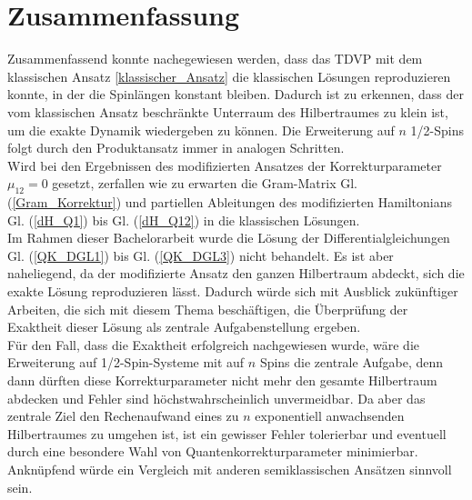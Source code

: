 \chapter{Zusammenfassung}
Zusammenfassend konnte nachegewiesen werden, dass das TDVP mit dem klassischen Ansatz \ref{klassischer_Ansatz} die klassischen Lösungen reproduzieren 
konnte, in der die Spinlängen konstant bleiben. Dadurch ist zu erkennen, dass der vom klassischen Ansatz beschränkte Unterraum des Hilbertraumes zu klein
ist, um die exakte Dynamik wiedergeben zu können. Die Erweiterung auf $n$ 1/2-Spins folgt durch den Produktansatz immer in analogen Schritten.\\
Wird bei den Ergebnissen des modifizierten Ansatzes der Korrekturparameter $\mu_{12}=0$ gesetzt, zerfallen wie zu erwarten
die Gram-Matrix Gl. (\ref{Gram_Korrektur}) und partiellen Ableitungen des modifizierten Hamiltonians Gl. (\ref{dH_Q1}) bis Gl. (\ref{dH_Q12})
in die klassischen Lösungen.\\

Im Rahmen dieser Bachelorarbeit wurde die Lösung der Differentialgleichungen Gl. (\ref{QK_DGL1}) bis Gl. (\ref{QK_DGL3}) nicht behandelt. Es ist 
aber naheliegend, da der modifizierte Ansatz den ganzen Hilbertraum abdeckt, sich die exakte Lösung reproduzieren lässt. Dadurch würde sich 
mit Ausblick zukünftiger Arbeiten, die sich mit diesem Thema beschäftigen, die Überprüfung der Exaktheit dieser Lösung als zentrale Aufgabenstellung ergeben. \\
Für den Fall, dass die Exaktheit erfolgreich nachgewiesen wurde, wäre die Erweiterung auf 1/2-Spin-Systeme mit auf $n$ Spins die zentrale Aufgabe, 
denn dann dürften diese Korrekturparameter nicht mehr den gesamte Hilbertraum abdecken und Fehler sind höchstwahrscheinlich unvermeidbar. 
Da aber das zentrale Ziel den Rechenaufwand eines zu $n$ exponentiell anwachsenden Hilbertraumes zu umgehen ist, ist 
ein gewisser Fehler tolerierbar und eventuell durch eine besondere Wahl von Quantenkorrekturparameter minimierbar. Anknüpfend würde ein Vergleich mit 
anderen semiklassischen Ansätzen sinnvoll sein.
